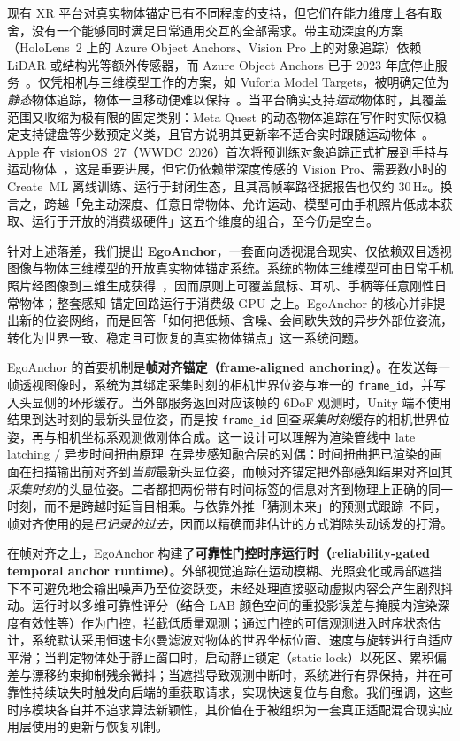\documentclass[review]{vgtc}
\begin{document}
现有 XR 平台对真实物体锚定已有不同程度的支持，但它们在能力维度上各有取舍，没有一个能够同时满足日常通用交互的全部需求。带主动深度的方案（HoloLens~2 上的 Azure Object Anchors、Vision Pro 上的对象追踪）依赖 LiDAR 或结构光等额外传感器，而 Azure Object Anchors 已于 2023 年底停止服务~\cite{azureObjectAnchors}。仅凭相机与三维模型工作的方案，如 Vuforia Model Targets，被明确定位为\emph{静态}物体追踪，物体一旦移动便难以保持~\cite{vuforiaModelTargets}。当平台确实支持\emph{运动}物体时，其覆盖范围又收缩为极有限的固定类别：Meta Quest 的动态物体追踪在写作时实际仅稳定支持键盘等少数预定义类，且官方说明其更新率不适合实时跟随运动物体~\cite{metaDynamicObjectTracker,metaSceneOverview}。Apple 在 visionOS~27（WWDC~2026）首次将预训练对象追踪正式扩展到手持与运动物体~\cite{appleVisionOS27ObjectTracking}，这是重要进展，但它仍依赖带深度传感的 Vision Pro、需要数小时的 Create~ML 离线训练、运行于封闭生态，且其高帧率路径据报告也仅约 30\,Hz。换言之，跨越「免主动深度、任意日常物体、允许运动、模型可由手机照片低成本获取、运行于开放的消费级硬件」这五个维度的组合，至今仍是空白。

针对上述落差，我们提出 \textbf{EgoAnchor}，一套面向透视混合现实、仅依赖双目透视图像与物体三维模型的开放真实物体锚定系统。系统的物体三维模型可由日常手机照片经图像到三维生成获得~\cite{trellis2024,appleObjectCapture}，因而原则上可覆盖鼠标、耳机、手柄等任意刚性日常物体；整套感知-锚定回路运行于消费级 GPU 之上。EgoAnchor 的核心并非提出新的位姿网络，而是回答「如何把低频、含噪、会间歇失效的异步外部位姿流，转化为世界一致、稳定且可恢复的真实物体锚点」这一系统问题。

EgoAnchor 的首要机制是\textbf{帧对齐锚定（frame-aligned anchoring）}。在发送每一帧透视图像时，系统为其绑定采集时刻的相机世界位姿与唯一的 \texttt{frame\_id}，并写入头显侧的环形缓存。当外部服务返回对应该帧的 6DoF 观测时，Unity 端不使用结果到达时刻的最新头显位姿，而是按 \texttt{frame\_id} 回查\emph{采集时刻}缓存的相机世界位姿，再与相机坐标系观测做刚体合成。这一设计可以理解为渲染管线中 late latching / 异步时间扭曲原理~\cite{vanwaveren2016atw,mark1997postrendering}在异步感知融合层的对偶：时间扭曲把已渲染的画面在扫描输出前对齐到\emph{当前}最新头显位姿，而帧对齐锚定把外部感知结果对齐回其\emph{采集时刻}的头显位姿。二者都把两份带有时间标签的信息对齐到物理上正确的同一时刻，而不是跨越时延盲目相乘。与依靠外推「猜测未来」的预测式跟踪~\cite{azuma1994improving}不同，帧对齐使用的是\emph{已记录的过去}，因而以精确而非估计的方式消除头动诱发的打滑。

在帧对齐之上，EgoAnchor 构建了\textbf{可靠性门控时序运行时（reliability-gated temporal anchor runtime）}。外部视觉追踪在运动模糊、光照变化或局部遮挡下不可避免地会输出噪声乃至位姿跃变，未经处理直接驱动虚拟内容会产生剧烈抖动。运行时以多维可靠性评分（结合 LAB 颜色空间的重投影误差与掩膜内渲染深度有效性等）作为门控，拦截低质量观测；通过门控的可信观测进入时序状态估计，系统默认采用恒速卡尔曼滤波对物体的世界坐标位置、速度与旋转进行自适应平滑；当判定物体处于静止窗口时，启动静止锁定（static lock）以死区、累积偏差与漂移约束抑制残余微抖；当遮挡导致观测中断时，系统进行有界保持，并在可靠性持续缺失时触发向后端的重获取请求，实现快速复位与自愈。我们强调，这些时序模块各自并不追求算法新颖性，其价值在于被组织为一套真正适配混合现实应用层使用的更新与恢复机制。
\end{document}
